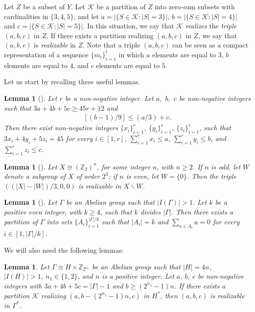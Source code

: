 \documentclass[final]{dmtcs-episciences}
\newcommand{\comS}[1]{{\color{olive} (Komentarz: #1)}}
\newtheorem{lem}[thm]{Lemma}
\newcommand{\zet}{\mathbb{Z}}
\begin{document}
Let $Z$ be a subset of $Y$. Let $\mathcal{K}$ be a partition of $Z$ into zero-sum subsets with cardinalities in $\{3,4,5\}$, and let $a = |\{S \in\mathcal{K}\colon |S|=3\}|$, $b = |\{S \in\mathcal{K}\colon |S|=4\}|$ and $c = |\{S \in\mathcal{K}\colon |S|=5\}|$. In this situation, we say that $\mathcal{K}$ \textit{realizes} the \textit{triple} $(a, b,c)$ in $Z$. If there exists a partition realizing $(a, b,c)$ in $Z$, we say that $(a, b,c)$ is \textit{realizable} in $Z$. Note that a triple $(a,b,c)$ can be seen as a compact representation of a sequence $\{m_i\}_{i=1}^{t}$ in which $a$ elements are equal to $3$, $b$ elements are equal to $4$, and $c$ elements are equal to $5$.

Let us start by recalling three useful lemmas.

\begin{lem}[\citet{Egawa}]\label{l2.2} Let $r$ be a non-negative integer. Let $a,$ $b,$ $c$ be non-negative integers such that $3a+4b+5c\geq 45r+12$ and
\begin{align}\label{2.9}
[(b-1)/9]\leq(a/3)+c.\end{align}
Then there exist non-negative integers $\{x_i\}_{i=1}^r$, $\{y_i\}_{i=1}^r$, $\{z_i\}_{i=1}^r$, such that $3x_{i}+4y_{i}+5z_{i}=45$ for every  {$i\in [1 , r]$},  $\sum_{i=1}^r x_{i}\leq a$, $\sum_{i=1}^r y_{i}\leq b$, and $\sum_{i=1}^r z_{i}\leq c$.\end{lem}

\begin{lem}[\citet{Egawa}]\label{l3.11} Let $X\cong (\zet_{2})^n$, for some integer $n$, with $n\ge 2$. If $n$ is odd, let $W$ denote a subgroup of $X$ of order $2^3$; if $n$ is even, let
$W=\{0\}$. Then the triple $((|X|-|W|)/3,0,0)$ is realizable in $X\backslash W$.\end{lem} 

\begin{lem}[\citet{CicZ}]\label{cichacz} Let $\Gamma$ be an Abelian group such that $|I(\Gamma)|>1$. Let $k$ be a positive even integer, with $k\geq 4$, such that $k$ divides $|\Gamma|$. Then there exists a partition of $\Gamma$ into sets $\{A_i\}_{i=1}^{|\Gamma|/k}$ such that $|A_i|= k$ and $\sum_{a\in A_i} a=0$ for every {$i\in[1 , |\Gamma|/k]$}.\end{lem}

We will also need the following lemmas:

\begin{lem}\label{l3.12} Let $\Gamma\cong H\times \zet_{2^{n_1}}$ be an Abelian group such that $|H|=4n$, $|I(H)|>1$, $n_1\in\{1,2\}$, and $n$ is a positive integer. Let $a$, $b$, $c$ be non-negative integers with $3a+4b+5c=|\Gamma|-1$ and $b\geq (2^{n_1}-1)n$. If there exists a partition $\mathcal{K}$ realizing $(a, b-(2^{n_1}-1)n, c)$ in $H^{*}$, then $(a, b, c)$ is realizable in $\Gamma^{*}$. \end{lem}
\end{document}
